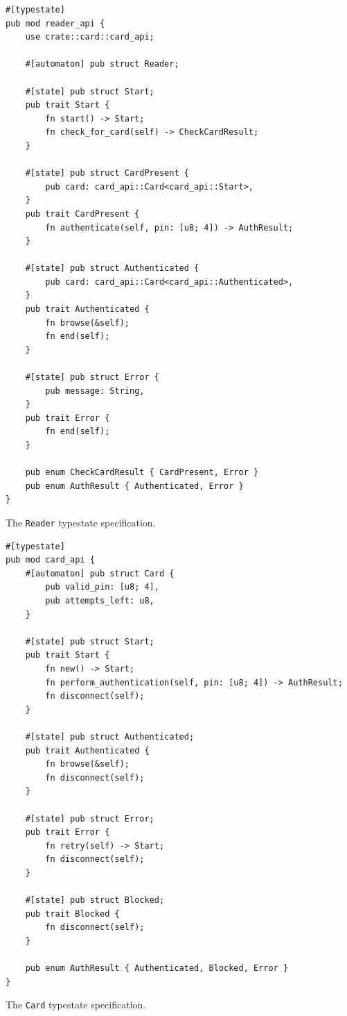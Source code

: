\begin{listing}
    \begin{verbatim}
#[typestate]
pub mod reader_api {
    use crate::card::card_api;

    #[automaton] pub struct Reader;

    #[state] pub struct Start;
    pub trait Start {
        fn start() -> Start;
        fn check_for_card(self) -> CheckCardResult;
    }

    #[state] pub struct CardPresent {
        pub card: card_api::Card<card_api::Start>,
    }
    pub trait CardPresent {
        fn authenticate(self, pin: [u8; 4]) -> AuthResult;
    }

    #[state] pub struct Authenticated {
        pub card: card_api::Card<card_api::Authenticated>,
    }
    pub trait Authenticated {
        fn browse(&self);
        fn end(self);
    }

    #[state] pub struct Error {
        pub message: String,
    }
    pub trait Error {
        fn end(self);
    }

    pub enum CheckCardResult { CardPresent, Error }
    pub enum AuthResult { Authenticated, Error }
}
    \end{verbatim}
    \caption{The \textcolor{structblue}{\texttt{Reader}} typestate specification.}
    \label{lst:typestate-reader}
\end{listing}

\begin{listing}
    \begin{verbatim}
#[typestate]
pub mod card_api {
    #[automaton] pub struct Card {
        pub valid_pin: [u8; 4],
        pub attempts_left: u8,
    }

    #[state] pub struct Start;
    pub trait Start {
        fn new() -> Start;
        fn perform_authentication(self, pin: [u8; 4]) -> AuthResult;
        fn disconnect(self);
    }

    #[state] pub struct Authenticated;
    pub trait Authenticated {
        fn browse(&self);
        fn disconnect(self);
    }

    #[state] pub struct Error;
    pub trait Error {
        fn retry(self) -> Start;
        fn disconnect(self);
    }

    #[state] pub struct Blocked;
    pub trait Blocked {
        fn disconnect(self);
    }

    pub enum AuthResult { Authenticated, Blocked, Error }
}
    \end{verbatim}
    \caption{The \textcolor{structblue}{\texttt{Card}} typestate specification.}
    \label{lst:typestate-card}
\end{listing}


